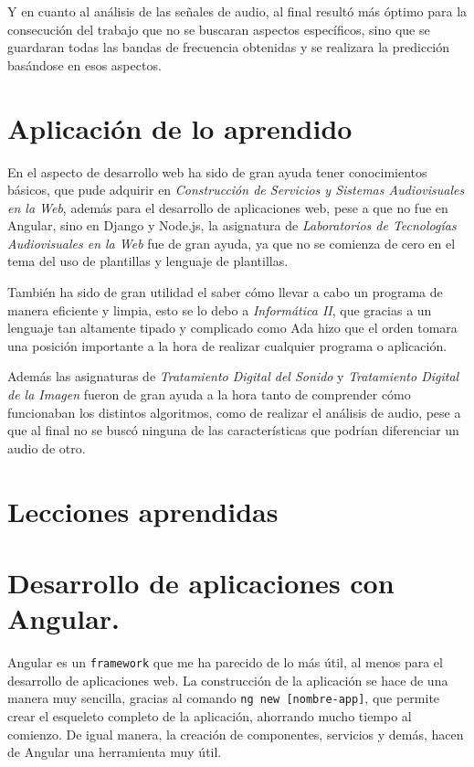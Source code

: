 \documentclass[a4paper, 12pt]{book}
\begin{document}
Y en cuanto al análisis de las señales de audio, al final resultó más óptimo para la consecución del trabajo que no se buscaran aspectos específicos, sino que se guardaran todas las bandas de frecuencia obtenidas y se realizara la predicción basándose en esos aspectos.

\section{Aplicación de lo aprendido}
\label{sec:aplicacion}

En el aspecto de desarrollo web ha sido de gran ayuda tener conocimientos básicos, que pude adquirir en \textit{Construcción de Servicios y Sistemas Audiovisuales en la Web}, además para el desarrollo de aplicaciones web, pese a que no fue en Angular, sino en Django y Node.js, la asignatura de \textit{Laboratorios de Tecnologías Audiovisuales en la Web} fue de gran ayuda, ya que no se comienza de cero en el tema del uso de plantillas y lenguaje de plantillas.

También ha sido de gran utilidad el saber cómo llevar a cabo un programa de manera eficiente y limpia, esto se lo debo a \textit{Informática II}, que gracias a un lenguaje tan altamente tipado y complicado como Ada hizo que el orden tomara una posición importante a la hora de realizar cualquier programa o aplicación.

Además las asignaturas de \textit{Tratamiento Digital del Sonido} y \textit{Tratamiento Digital de la Imagen} fueron de gran ayuda a la hora tanto de comprender cómo funcionaban los distintos algoritmos, como de realizar el análisis de audio, pese a que al final no se buscó ninguna de las características que podrían diferenciar un audio de otro.


\section{Lecciones aprendidas}
\label{sec:lecciones_aprendidas}

\section*{Desarrollo de aplicaciones con Angular.}

Angular es un \texttt{framework} que me ha parecido de lo más útil, al menos para el desarrollo de aplicaciones web. La construcción de la aplicación se hace de una manera muy sencilla, gracias al comando \texttt{ng new [nombre-app]}, que permite crear el esqueleto completo de la aplicación, ahorrando mucho tiempo al comienzo. De igual manera, la creación de componentes, servicios y demás, hacen de Angular una herramienta muy útil.
\end{document}
